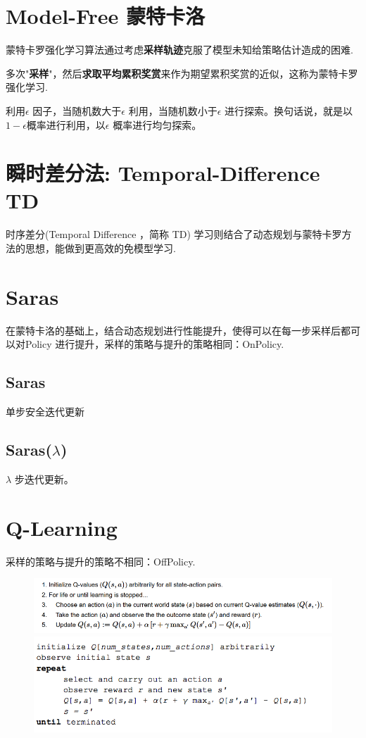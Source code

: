 \documentclass[UTF8,a4paper,12pt]{ctexbook}
\begin{document}
		
	\section{Model-Free 蒙特卡洛}
		蒙特卡罗强化学习算法通过考虑\textbf{采样轨迹}克服了模型未知给策略估计造成的困难.
		
		多次"\textbf{采样}"，然后\textbf{求取平均累积奖赏}来作为期望累积奖赏的近似，这称为蒙特卡罗强化学习.
		
		利用$\epsilon$ 因子，当随机数大于$\epsilon$ 利用，当随机数小于$\epsilon$ 进行探索。换句话说，就是以$1-\epsilon$概率进行利用，以$\epsilon$ 概率进行均匀探索。 
		
		
		
	\section{瞬时差分法: Temporal-Difference TD}
		时序差分(Temporal Difference ，简称 TD) 学习则结合了动态规划与蒙特卡罗方法的思想，能做到更高效的免模型学习.

	\section{Saras}
		在蒙特卡洛的基础上，结合动态规划进行性能提升，使得可以在每一步采样后都可以对Policy 进行提升，采样的策略与提升的策略相同：OnPolicy.
		
		\subsection{Saras}
			单步安全迭代更新
		
		\subsection{Saras($\lambda$)}
			$\lambda$ 步迭代更新。
				
	\section{Q-Learning}
		采样的策略与提升的策略不相同：OffPolicy.
	
		\begin{figure}[H]
			\centering
			\includegraphics[width=\linewidth]{qFuncProcess2}
			\includegraphics[width=\linewidth]{qFuncProcess3}
		\end{figure}
\end{document}
